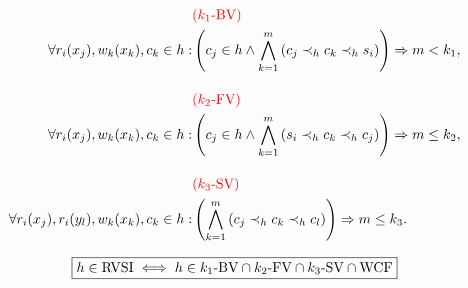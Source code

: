 \begin{frame}{}
  \begin{align*}
    & \textcolor{red}{(k_1\text{-BV}{})} \\
    \forall r_i(x_{j}), w_k(x_k), c_k \in h: 
    & \left(c_j \in h \land \bigwedge_{k=1}^{m} \left(c_j \prec_{h} c_k \prec_{h} s_i \right)\right) \Rightarrow m < k_1, \\[10pt]
    & \textcolor{red}{(k_2\text{-FV}{})} \\
    \forall r_i(x_{j}), w_k(x_k), c_k \in h:
    & \left(c_j \in h \land \bigwedge_{k=1}^{m} \left(s_i \prec_{h} c_k \prec_{h} c_j \right)\right) \Rightarrow m \le k_2, \\[10pt]
    & \textcolor{red}{(k_3\text{-SV}{})} \\
    \forall r_i(x_j), r_i(y_l), w_k(x_k), c_k \in h:
    & \left(\bigwedge_{k=1}^{m} \left(c_j \prec_{h} c_k \prec_{h} c_l \right)\right) \Rightarrow m \le k_3.
  \end{align*}

  \pause
  \begin{equation*}
    \boxed{h \in \text{RVSI}{} \iff h \in k_1\text{-BV}{} \cap k_2\text{-FV}{} \cap k_3\text{-SV}{} \cap \text{WCF}{}}
  \end{equation*}
\end{frame}
